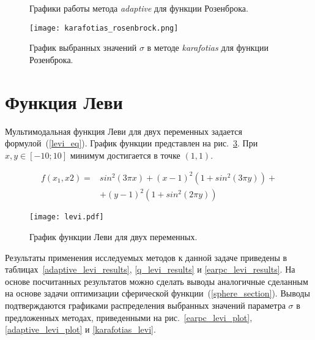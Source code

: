 \begin{figure}
  \centering
  \caption{ Графики работы метода \textit{adaptive} для функции Розенброка.}
  \label{adaptive_rosenbrock_plot}
\end{figure}

\begin{figure}
  \centering
  \texttt{[image: karafotias\_rosenbrock.png]}
  \caption{График выбранных значений $\sigma$ в методе \textit{karafotias} для функции Розенброка.}
  \label{karafotias_rosenbrock}
\end{figure}

\section{Функция Леви}

Мультимодальная функция Леви для двух переменных задается формулой~(\ref{levi_eq}). График функции представлен на рис.~\ref{levi_plot}. При $x, y \in [-10; 10]$ минимум достигается в точке $(1, 1)$.

\begin{equation}
\label{levi_eq}
\begin{split}
f(x_1, x2) = &sin^2(3\pi x) + (x - 1)^2(1 + sin^2(3\pi y)) + \\
& + (y - 1)^2(1 + sin^2(2\pi y))
\end{split}
\end{equation}

\begin{figure}
    \centering
    \texttt{[image: levi.pdf]}
    \caption{График функции Леви для двух переменных.}
    \label{levi_plot}
\end{figure}

Результаты применения исследуемых методов к данной задаче приведены в таблицах~\ref{adaptive_levi_results}, \ref{q_levi_results} и \ref{earpc_levi_results}. На основе посчитанных результатов можно сделать выводы аналогичные сделанным на основе задачи оптимизации сферической функции~(\protect\ref{sphere_section}). Выводы подтверждаются графиками распределения выбранных значений параметра $\sigma$ в предложенных методах, приведенными на рис.~\ref{earpc_levi_plot}, \ref{adaptive_levi_plot} и \ref{karafotias_levi}.

